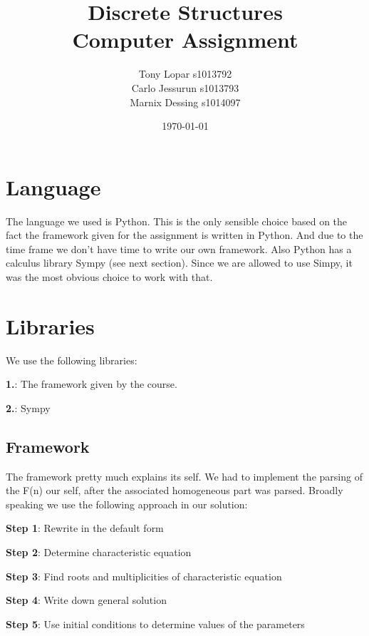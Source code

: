 \documentclass{article}
\begin{document}
\title{Discrete Structures \\ Computer Assignment}
\date{\today}
\author{Tony Lopar s1013792 \\ Carlo Jessurun s1013793 \\ Marnix Dessing s1014097}
\maketitle

\section{Language}
The language we used is Python. This is the only sensible choice based on the fact the framework given for the assignment is written in Python. And due to the time frame we don't have time to write our own framework. Also Python has a calculus library Sympy (see next section). Since we are allowed to use Simpy, it was the most obvious choice to work with that.

\section{Libraries}
We use the following libraries:

\textbf{1.}: The framework given by the course.

\textbf{2.}: Sympy

\subsection{Framework}
The framework pretty much explains its self.
We had to implement the parsing of the F(n) our self, after the associated homogeneous part was parsed. Broadly speaking we use the following approach in our solution:

\textbf{Step 1}: Rewrite in the default form

\textbf{Step 2}: Determine characteristic equation

\textbf{Step 3}: Find roots and multiplicities of characteristic equation

\textbf{Step 4}: Write down general solution

\textbf{Step 5}: Use initial conditions to determine values of the parameters

\newpage
\end{document}
